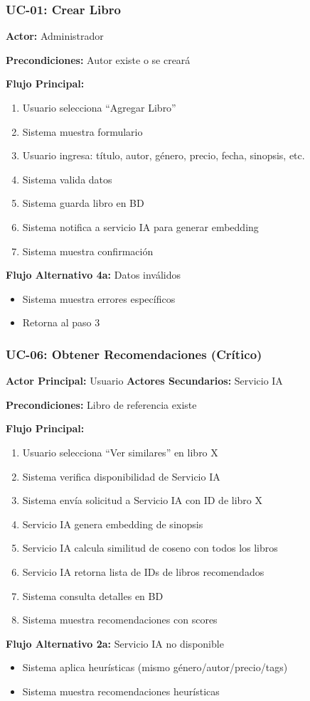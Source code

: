 \documentclass[aspectratio=169]{beamer}
\begin{document}
\begin{frame}
\frametitle{UC-01: Crear Libro}

\textbf{Actor:} Administrador

\textbf{Precondiciones:} Autor existe o se creará

\textbf{Flujo Principal:}
\begin{enumerate}
\item Usuario selecciona ``Agregar Libro''
\item Sistema muestra formulario
\item Usuario ingresa: título, autor, género, precio, fecha, sinopsis, etc.
\item Sistema valida datos
\item Sistema guarda libro en BD
\item Sistema notifica a servicio IA para generar embedding
\item Sistema muestra confirmación
\end{enumerate}

\textbf{Flujo Alternativo 4a:} Datos inválidos
\begin{itemize}
\item Sistema muestra errores específicos
\item Retorna al paso 3
\end{itemize}

\end{frame}

\begin{frame}
\frametitle{UC-06: Obtener Recomendaciones (Crítico)}

\textbf{Actor Principal:} Usuario  
\textbf{Actores Secundarios:} Servicio IA

\textbf{Precondiciones:} Libro de referencia existe

\textbf{Flujo Principal:}
\begin{enumerate}
\item Usuario selecciona ``Ver similares'' en libro X
\item Sistema verifica disponibilidad de Servicio IA
\item Sistema envía solicitud a Servicio IA con ID de libro X
\item Servicio IA genera embedding de sinopsis
\item Servicio IA calcula similitud de coseno con todos los libros
\item Servicio IA retorna lista de IDs de libros recomendados
\item Sistema consulta detalles en BD
\item Sistema muestra recomendaciones con scores
\end{enumerate}

\textbf{Flujo Alternativo 2a:} Servicio IA no disponible
\begin{itemize}
\item Sistema aplica heurísticas (mismo género/autor/precio/tags)
\item Sistema muestra recomendaciones heurísticas
\end{itemize}

\end{frame}
\end{document}
